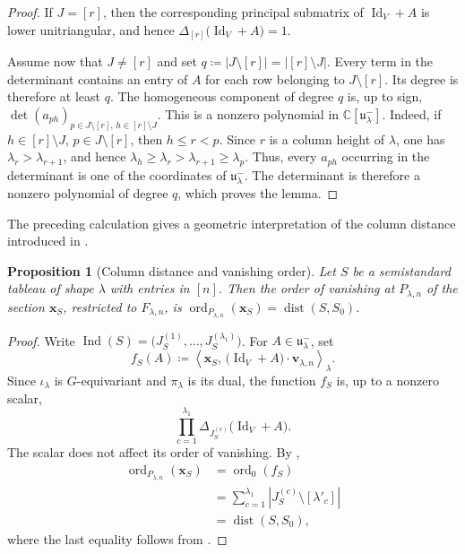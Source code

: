 \documentclass[a4paper,reqno]{amsart}
\theoremstyle{plainnopunct}
\newtheorem{proposition}[proposition]{Proposition}
\theoremstyle{definitionnopunct}
\newcommand{\C}{\mathbb{C}}
\newcommand{\ind}{\operatorname{Ind}}
\newcommand{\dist}{\operatorname{dist}}
\newcommand{\bx}{\mathbf{x}}
\newcommand{\bv}{\mathbf{v}}
\begin{document}
\begin{proof}
If $J=[r]$, then the corresponding principal submatrix of $\operatorname{Id}_V+A$ is lower unitriangular, and hence $\Delta_{[r]}
\bigl(\operatorname{Id}_V+A\bigr) = 1$.

Assume now that $J\neq[r]$ and set $q \coloneq |J\setminus[r]| = |[r]\setminus J|$.
Every term in the determinant contains an entry of $A$ for each row belonging to $J\setminus[r]$. Its degree is therefore at least $q$.  The homogeneous component of degree $q$ is, up to sign,
$\det
\left(
a_{ph}
\right)_{
p\in J\setminus[r],\,
h\in[r]\setminus J
}$. This is a nonzero polynomial in $\C[\mathfrak u^-_\lambda]$. Indeed, if $h\in[r]\setminus J$, $p\in J\setminus[r]$, then $h\leq r<p$. Since $r$ is a column height of $\lambda$, one has $\lambda_r>\lambda_{r+1}$, and hence $\lambda_h\geq\lambda_r >\lambda_{r+1} \geq \lambda_p$.
Thus, every $a_{ph}$ occurring in the determinant is one of the coordinates of $\mathfrak u^-_\lambda$. The determinant is therefore a nonzero polynomial of degree $q$, which proves the lemma.\end{proof}

The preceding calculation gives a geometric interpretation of the column distance introduced in .

\begin{proposition}[Column distance and vanishing order]
\label{prop: column distance vanishing order}
Let $S$ be a semistandard tableau of shape $\lambda$ with entries in $[n]$. Then the order of vanishing at $P_{\lambda,n}$ of the section $\bx_S$, restricted to $F_{\lambda,n}$, is
$\operatorname{ord}_{P_{\lambda,n}}(\bx_S)
=
\dist(S,S_0)$.
\end{proposition}

\begin{proof}
Write
$\ind(S)
=
\bigl(
J_S^{(1)},\ldots,J_S^{(\lambda_1)}
\bigr)$.
For $A\in\mathfrak u^-_\lambda$, set
\[f_S(A)
\coloneq
\left\langle
\bx_S,\,
\bigl(\operatorname{Id}_V+A\bigr)\cdot\bv_{\lambda,n}
\right\rangle_\lambda.
\]
Since $\iota_\lambda$ is $G$-equivariant and $\pi_\lambda$ is its dual, the function $f_S$ is, up to a nonzero scalar,
\[
\prod_{c=1}^{\lambda_1}
\Delta_{J_S^{(c)}}
\bigl(\operatorname{Id}_V+A\bigr).
\]
The scalar does not affect its order of vanishing. By ,
\[
\begin{aligned}
\operatorname{ord}_{P_{\lambda,n}}(\bx_S)
&=
\operatorname{ord}_0(f_S)
\\
&=
\sum_{c=1}^{\lambda_1}
\left|
J_S^{(c)}
\setminus
[\lambda'_c]
\right|
\\
&=
\dist(S,S_0),
\end{aligned}
\]
where the last equality follows from .
\end{proof}
\end{document}
